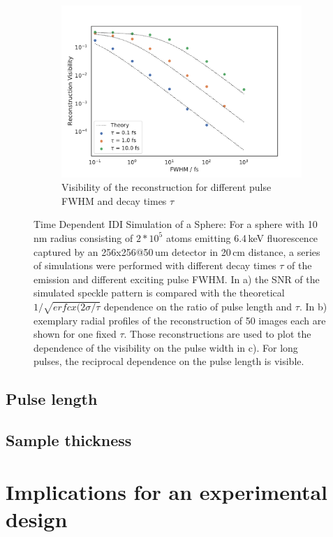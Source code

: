 \begin{figure}
\begin{subfigure}[b]{0.32\textwidth}
		\includegraphics[width=\linewidth]{images/timedependent_2.pdf}
		\caption{Visibility of the reconstruction for different pulse FWHM and decay times $\tau$}
	\end{subfigure}
	\caption[Time Dependent IDI Simulation of a Sphere]{Time Dependent IDI Simulation of a Sphere: For a sphere with 10\,nm radius consisting of $2*10^5$ atoms emitting 6.4\,keV fluorescence captured by an 256x256@50\,um detector in 20\,cm distance, a series of simulations were performed with different decay times $\tau$ of the emission and different exciting pulse FWHM. In a) the SNR of the simulated speckle pattern is compared with the theoretical  $1/\sqrt{erfcx(2\sigma/\tau}$ dependence on the ratio of pulse length and $\tau$. In b) exemplary radial profiles of the reconstruction of 50 images each are shown for one fixed $\tau$. Those reconstructions are used to plot the  dependence of the visibility on the pulse width in c). For long pulses, the reciprocal dependence on the pulse length is visible.}
	\label{fig:tdpshere}
\end{figure}

\subsection{Pulse length}
\subsection{Sample thickness}



\section{Implications for an experimental design}

